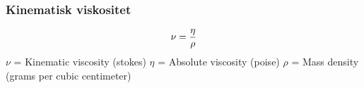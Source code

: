 \documentclass{beamer}
\begin{document}
%
%
\begin{frame}
	\frametitle{Kinematisk viskositet}

	


%
%
$$\nu = {\eta \over \rho}$$
%
%
$\nu$ = Kinematic viscosity (stokes)
%
$\eta$ = Absolute viscosity (poise)
%
$\rho$ = Mass density (grams per cubic centimeter)
%
%
\end{frame}
%
%
%
%
%
%
%
%
%
%
\end{document}
